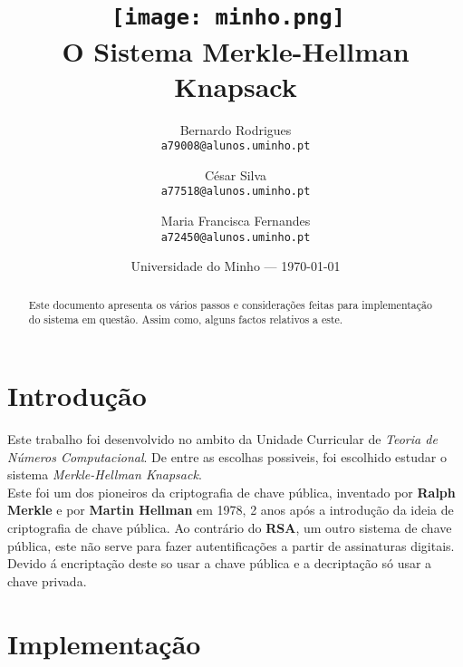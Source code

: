 \documentclass[11pt, language=portuguese]{report}
\begin{document}
\title{\texttt{[image: minho.png]}~\\[1cm] O Sistema Merkle-Hellman Knapsack}

\author{Bernardo Rodrigues\\ \texttt{a79008@alunos.uminho.pt}\\ \and César Silva\\ \texttt{a77518@alunos.uminho.pt}\\ \and Maria Francisca Fernandes\\ \texttt{a72450@alunos.uminho.pt}\\}

\date{Universidade do Minho --- \today}

\maketitle

\begin{abstract}

	Este documento apresenta os vários passos e considerações feitas para implementação do sistema em questão. Assim como, alguns factos relativos a este.  


\end{abstract}

\tableofcontents

\listofalgorithms

\chapter{Introdução}

Este trabalho foi desenvolvido no ambito da Unidade Curricular de \textit{Teoria de Números Computacional}. De entre as escolhas possiveis, foi escolhido estudar o sistema \textit{Merkle-Hellman Knapsack}. \\
Este foi um dos pioneiros da criptografia de chave pública, inventado por \textbf{Ralph Merkle} e por \textbf{Martin Hellman} em 1978, 2 anos após a introdução da ideia de criptografia de chave pública.
Ao contrário do \textbf{RSA}, um outro sistema de chave pública, este não serve para fazer autentificações a partir de assinaturas digitais. Devido á encriptação deste so usar a chave pública e a decriptação só usar a chave privada.  

\chapter{Implementação}
\end{document}
